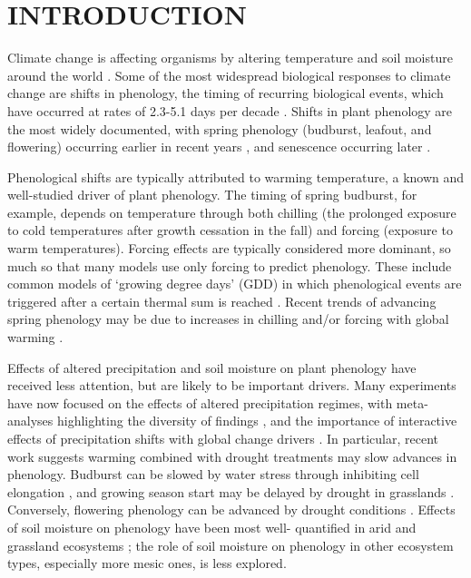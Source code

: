\documentclass{article}
\begin{document}
\newpage
\section* {INTRODUCTION} 
\par Climate change is affecting organisms by altering temperature and soil moisture around the world \citep{parmesan2006,chen2011}. Some of the most widespread biological responses to climate change are shifts in phenology, the timing of recurring biological events, which have occurred at rates of 2.3-5.1 days per decade \citep{parmesan2006,poloczanska2013,root2003}. Shifts in plant phenology are the most widely documented, with spring phenology (budburst, leafout, and flowering) occurring earlier in recent years \citep{wolkovich2012}, and senescence occurring later \citep{taylor2008,delpierre2009}. 
\par Phenological shifts are typically attributed to warming temperature, a known and well-studied driver of plant phenology. The timing of spring budburst, for example, depends on temperature through both chilling (the prolonged exposure to cold temperatures after growth cessation in the fall) and forcing (exposure to warm temperatures). Forcing effects are typically considered more dominant, so much so that many models use only forcing to predict phenology. These include common models of `growing degree days' (GDD) in which phenological events are triggered after a certain thermal sum is reached \citep[e.g., ][]{olsson2014process}. Recent trends of advancing spring phenology may be due to increases in chilling and/or forcing with global warming \citep{fujisawa2010, ibanez2010,cook2012b}. %

\par Effects of altered precipitation and soil moisture on plant phenology have received less attention, but are likely to be important drivers. Many experiments have now focused on the effects of altered precipitation regimes, with meta-analyses highlighting the diversity of findings \citep{lu2023contrasting}, and the importance of interactive effects of precipitation shifts with global change drivers \citep{zhou2023climate}. In particular, recent work \citep{zhou2023climate} suggests warming combined with drought treatments may slow advances in phenology. Budburst can be slowed by water stress through inhibiting cell elongation \citep{essiamah1986}, and growing season start may be delayed by drought in grasslands \cite{cui2017}. Conversely, flowering phenology can be advanced by drought conditions \citep{hamann2018}. Effects of soil moisture on phenology have been most well- quantified in arid and grassland ecosystems \citep[e.g., ][]{essiamah1986,reich1984, van1993, tao2019}; the role of soil moisture on phenology in other ecosystem types, especially more mesic ones, is less explored. 
\end{document}
